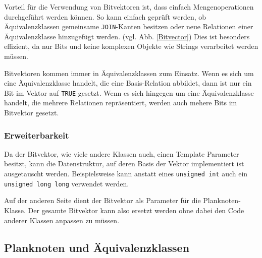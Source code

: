 Vorteil für die Verwendung von Bitvektoren ist, dass einfach Mengenoperationen durchgeführt werden können. So kann einfach geprüft werden, ob Äquivalenzklassen gemeinsame \texttt{JOIN}-Kanten besitzen oder neue Relationen einer Äquivalenzklasse hinzugefügt werden. (vgl. Abb. \ref{Bitvector}) Dies ist besonders effizient, da nur Bits und keine komplexen Objekte wie Strings verarbeitet werden müssen.



Bitvektoren kommen immer in Äquivalenzklassen zum Einsatz. Wenn es sich um eine Äquivalenzklasse handelt, die eine Basis-Relation abbildet, dann ist nur ein Bit im Vektor auf \texttt{TRUE} gesetzt. Wenn es sich hingegen um eine Äquivalenzklasse handelt, die mehrere Relationen repräsentiert, werden auch mehere Bits im Bitvektor gesetzt.



\subsubsection{Erweiterbarkeit}

Da der Bitvektor, wie viele andere Klassen auch, einen Template Parameter besitzt, kann die Datenstruktur, auf deren Basis der Vektor implementiert ist ausgetauscht werden. Beispielsweise kann anstatt eines \texttt{unsigned int} auch ein \texttt{unsigned long long} verwendet werden.

Auf der anderen Seite dient der Bitvektor als Parameter für die Planknoten-Klasse. Der gesamte Bitvektor kann also ersetzt werden ohne dabei den Code anderer Klassen anpassen zu müssen.


\subsection{Planknoten und Äquivalenzklassen}


